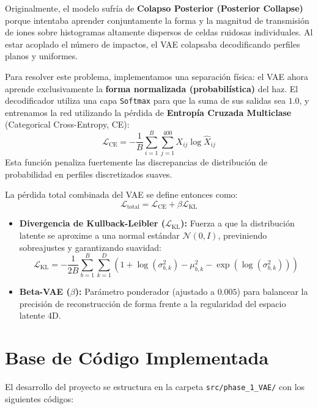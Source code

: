 \documentclass[12pt,letterpaper]{article}
\begin{document}
Originalmente, el modelo sufría de \textbf{Colapso Posterior (Posterior Collapse)} porque intentaba aprender conjuntamente la forma y la magnitud de transmisión de iones sobre histogramas altamente dispersos de celdas ruidosas individuales. Al estar acoplado el número de impactos, el VAE colapsaba decodificando perfiles planos y uniformes.

Para resolver este problema, implementamos una separación física: el VAE ahora aprende exclusivamente la \textbf{forma normalizada (probabilística)} del haz. El decodificador utiliza una capa \texttt{Softmax} para que la suma de sus salidas sea $1.0$, y entrenamos la red utilizando la pérdida de \textbf{Entropía Cruzada Multiclase} (Categorical Cross-Entropy, CE):
\begin{equation}
    \mathcal{L}_{\text{CE}} = -\frac{1}{B} \sum_{i=1}^B \sum_{j=1}^{400} X_{ij} \log \hat{X}_{ij}
\end{equation}
Esta función penaliza fuertemente las discrepancias de distribución de probabilidad en perfiles discretizados suaves.

La pérdida total combinada del VAE se define entonces como:
\begin{equation}
    \mathcal{L}_{\text{total}} = \mathcal{L}_{\text{CE}} + \beta \mathcal{L}_{\text{KL}}
\end{equation}
\begin{itemize}
    \item \textbf{Divergencia de Kullback-Leibler ($\mathcal{L}_{\text{KL}}$):} Fuerza a que la distribución latente se aproxime a una normal estándar $\mathcal{N}(0, I)$, previniendo sobreajustes y garantizando suavidad:
    \begin{equation}
        \mathcal{L}_{\text{KL}} = -\frac{1}{2 B} \sum_{b=1}^{B} \sum_{k=1}^{D} \left( 1 + \log(\sigma_{b,k}^2) - \mu_{b,k}^2 - \exp(\log(\sigma_{b,k}^2)) \right)
    \end{equation}
    \item \textbf{Beta-VAE ($\beta$):} Parámetro ponderador (ajustado a $0.005$) para balancear la precisión de reconstrucción de forma frente a la regularidad del espacio latente 4D.
\end{itemize}

\section{Base de Código Implementada}
El desarrollo del proyecto se estructura en la carpeta \texttt{src/phase\_1\_VAE/} con los siguientes códigos:
\end{document}
